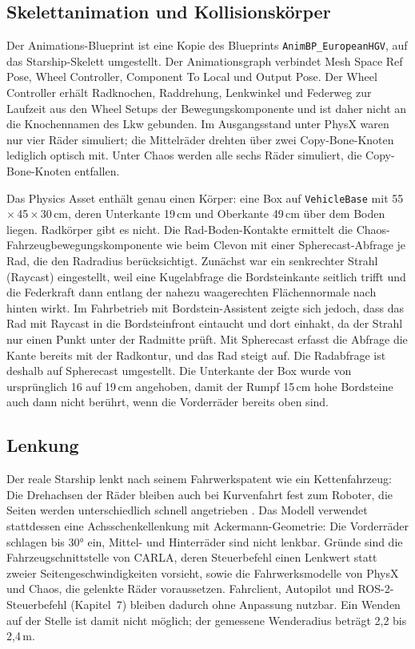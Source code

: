 
\subsection{Skelettanimation und Kollisionskörper}
\label{sec:starship_animation}

Der Animations-Blueprint ist eine Kopie des Blueprints \texttt{AnimBP\_EuropeanHGV}, auf
das Starship-Skelett umgestellt. Der Animationsgraph verbindet Mesh Space Ref Pose,
Wheel Controller, Component To Local und Output Pose. Der Wheel Controller erhält
Radknochen, Raddrehung, Lenkwinkel und Federweg zur Laufzeit aus den Wheel Setups der
Bewegungskomponente und ist daher nicht an die Knochennamen des Lkw gebunden. Im
Ausgangsstand unter PhysX waren nur vier Räder simuliert; die Mittelräder drehten über
zwei Copy-Bone-Knoten lediglich optisch mit. Unter Chaos werden alle sechs Räder
simuliert, die Copy-Bone-Knoten entfallen.

Das Physics Asset enthält genau einen Körper: eine Box auf \texttt{VehicleBase} mit
55\,$\times$\,45\,$\times$\,30\,cm, deren Unterkante 19\,cm und Oberkante 49\,cm über dem
Boden liegen. Radkörper gibt es nicht. Die Rad-Boden-Kontakte ermittelt die
Chaos-Fahrzeugbewegungskomponente wie beim Clevon mit einer Spherecast-Abfrage je Rad, die
den Radradius berücksichtigt. Zunächst war ein senkrechter Strahl (Raycast) eingestellt,
weil eine Kugelabfrage die Bordsteinkante seitlich trifft und die Federkraft dann entlang
der nahezu waagerechten Flächennormale nach hinten wirkt. Im Fahrbetrieb mit
Bordstein-Assistent zeigte sich jedoch, dass das Rad mit Raycast in die Bordsteinfront
eintaucht und dort einhakt, da der Strahl nur einen Punkt unter der Radmitte prüft. Mit
Spherecast erfasst die Abfrage die Kante bereits mit der Radkontur, und das Rad steigt
auf. Die Radabfrage ist deshalb auf Spherecast umgestellt.
Die Unterkante der Box wurde von ursprünglich 16 auf 19\,cm angehoben,
damit der Rumpf 15\,cm hohe Bordsteine auch dann nicht berührt, wenn die Vorderräder
bereits oben sind.

\subsection{Lenkung}
\label{sec:starship_lenkung}

Der reale Starship lenkt nach seinem Fahrwerkspatent wie ein Kettenfahrzeug: Die
Drehachsen der Räder bleiben auch bei Kurvenfahrt fest zum Roboter, die Seiten werden
unterschiedlich schnell angetrieben \parencite{starship_patent_fahrwerk}. Das Modell
verwendet stattdessen eine Achsschenkellenkung mit Ackermann-Geometrie: Die Vorderräder
schlagen bis 30° ein, Mittel- und Hinterräder sind nicht lenkbar. Gründe sind die
Fahrzeugschnittstelle von CARLA, deren Steuerbefehl einen Lenkwert statt zweier
Seitengeschwindigkeiten vorsieht, sowie die Fahrwerksmodelle von PhysX und Chaos, die
gelenkte Räder voraussetzen. Fahrclient, Autopilot und ROS-2-Steuerbefehl
(Kapitel~7) bleiben dadurch ohne Anpassung nutzbar. Ein Wenden auf der Stelle ist
damit nicht möglich; der gemessene Wenderadius beträgt 2,2 bis 2,4\,m.

